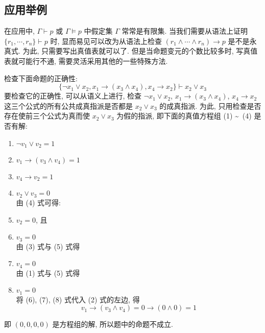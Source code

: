 \documentclass[
    mode=hazy,
    color=blue,
    device=normal,
    lang=cn
]{elegantnote}
\begin{document}
\subsection{应用举例}
在应用中, $\Gamma\vdash p$ 或 $\Gamma\vDash p$ 中假定集 $\Gamma$ 常常是有限集. 当我们需要从语法上证明 $\{r_1,\cdots,r_n\}\vdash p$ 时, 显而易见可以改为从语法上检查 $(r_1\land\cdots\land r_n)\to p$ 是不是永真式. 为此, 只需要写出真值表就可以了. 但是当命题变元的个数比较多时, 写真值表就可能行不通, 需要灵活采用其他的一些特殊方法.
\begin{example}
    检查下面命题的正确性:
    $$
    \{\lnot x_1\lor x_2,x_1\to (x_3\land x_4), x_4\to x_2\}\vdash x_2\lor x_3
    $$
    要检查它的正确性, 可以从语义上进行, 检查 $\lnot x_1\lor x_2$, $x_1\to (x_3\land x_4)$, $x_4\to x_2$ 这三个公式的所有公共成真指派是否都是 $x_2\lor x_3$ 的成真指派. 为此, 只用检查是否存在使前三个公式为真而使 $x_2\lor x_3$ 为假的指派, 即下面的真值方程组 (1) \textasciitilde \ (4) 是否有解:
    \begin{enumerate}[label = (\arabic*), listparindent = 2em, topsep = -1em]
        \item $\lnot v_1\lor v_2 = 1$
        \item $v_1\to (v_3\land v_4) = 1$
        \item $v_4\to v_2 = 1$
        \item $v_2\lor v_3 = 0$\\
        由 (4) 式可得:
        \item $v_2 = 0$, 且
        \item $v_3 = 0$\\
        由 (3) 式与 (5) 式得
        \item $v_4 = 0$\\
        由 (1) 式与 (5) 式得
        \item $v_1 = 0$\\
        将 (6), (7), (8) 式代入 (2) 式的左边, 得
        $$
        v_1 \to (v_3\land v_4) = 0\to (0\land 0) = 1
        $$
    \end{enumerate}
    即 $(0,0,0,0)$ 是方程组的解, 所以题中的命题不成立.
\end{example}
\end{document}
